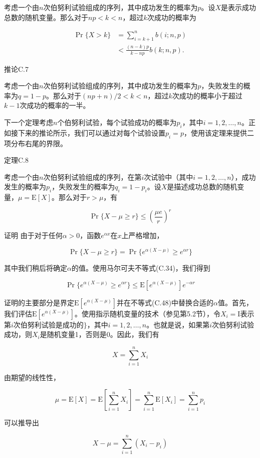 \documentclass[lang=cn,newtx,10pt,scheme=chinese]{elegantbook}
\begin{document}
考虑一个由$n$次伯努利试验组成的序列，其中成功发生的概率为$p$。设$X$是表示成功总数的随机变量。那么对于$n p<k<n$，超过$k$次成功的概率为

$$
\begin{aligned}
\operatorname{Pr}\{X>k\} & =\sum_{i=k+1}^n b(i ; n, p) \\
& <\frac{(n-k) p}{k-n p} b(k ; n, p) .
\end{aligned}
$$

推论C.7

考虑一个由$n$次伯努利试验组成的序列，其中成功发生的概率为$p$，失败发生的概率为$q=1-p$。那么对于$(n p+n) / 2<k<n$，超过$k$次成功的概率小于超过$k-1$次成功的概率的一半。

下一个定理考虑$n$个伯努利试验，每个试验成功的概率为$p_i$，其中$i=1,2, \ldots, n$。正如接下来的推论所示，我们可以通过对每个试验设置$p_i=p$，使用该定理来提供二项分布右尾的界限。

定理C.8

考虑一个由$n$次伯努利试验组成的序列，在第$i$次试验中（其中$i=1,2, \ldots, n$），成功发生的概率为$p_i$，失败发生的概率为$q_i=1-p_i$。设$X$是描述成功总数的随机变量，$\mu=\mathrm{E}[X]$。那么对于$r>\mu$，有

$$
\operatorname{Pr}\{X-\mu \geq r\} \leq(\frac{\mu e}{r})^r
$$

证明 由于对于任何$\alpha>0$，函数$e^{\alpha x}$在$x$上严格增加，

$$
\operatorname{Pr}\{X-\mu \geq r\}=\operatorname{Pr}\{e^{\alpha(X-\mu)} \geq e^{\alpha r}\}
$$

其中我们稍后将确定$\alpha$的值。使用马尔可夫不等式(C.34)，我们得到

$$
\operatorname{Pr}\{e^{\alpha(X-\mu)} \geq e^{\alpha r}\} \leq \mathrm{E}[e^{\alpha(X-\mu)}] e^{-\alpha r}
$$

证明的主要部分是界定$\mathrm{E}[e^{\alpha(X-\mu)}]$并在不等式(C.48)中替换合适的$\alpha$值。首先，我们评估$\mathrm{E}[e^{\alpha(X-\mu)}]$。使用指示随机变量的技术（参见第5.2节），令$X_i=\mathrm{I}$表示第$i$次伯努利试验是成功的$\}$，其中$i=1,2, \ldots, n$。也就是说，如果第$i$次伯努利试验成功，则$X_i$是随机变量1，否则是0。因此，我们有

$$
X=\sum_{i=1}^n X_i
$$

由期望的线性性，

$$
\mu=\mathrm{E}[X]=\mathrm{E}[\sum_{i=1}^n X_i]=\sum_{i=1}^n \mathrm{E}[X_i]=\sum_{i=1}^n p_i
$$

可以推导出

$$
X-\mu=\sum_{i=1}^n(X_i-p_i)
$$
\end{document}
